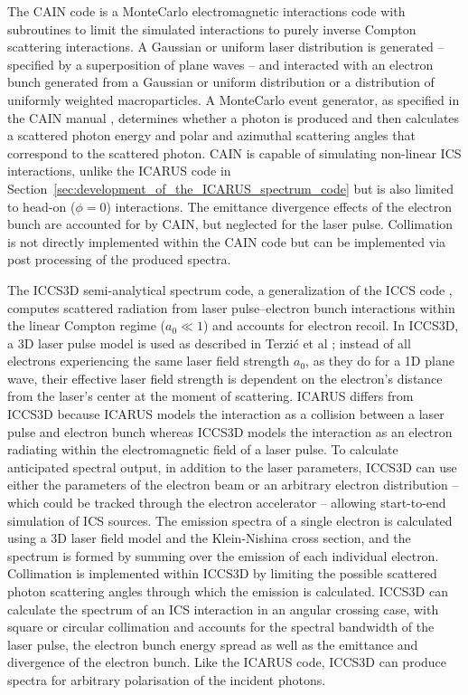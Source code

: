 \documentclass[../main.tex]{subfiles}
\begin{document}
The \textsc{CAIN} code is a MonteCarlo electromagnetic interactions code with subroutines to limit the simulated interactions to purely inverse Compton scattering interactions. A Gaussian or uniform laser distribution is generated -- specified by a superposition of plane waves -- and interacted with an electron bunch generated from a Gaussian or uniform distribution or a distribution of uniformly weighted macroparticles. A MonteCarlo event generator, as specified in the \textsc{CAIN} manual \cite{yokoya2003users}, determines whether a photon is produced and then calculates a scattered photon energy and polar and azimuthal scattering angles that correspond to the scattered photon. \textsc{CAIN} is capable of simulating non-linear ICS interactions, unlike the \textsc{ICARUS} code in Section~\ref{sec:development_of_the_ICARUS_spectrum_code} but is also limited to head-on ($\phi=0$) interactions. The emittance divergence effects of the electron bunch are accounted for by \textsc{CAIN}, but neglected for the laser pulse. Collimation is not directly implemented within the \textsc{CAIN} code but can be implemented via post processing of the produced spectra. 

The \textsc{ICCS3D} semi-analytical spectrum code, a generalization of the \textsc{ICCS} code \cite{krafft2016laser,ranjan2018simulation}, computes scattered radiation from laser pulse--electron bunch interactions within the linear Compton regime ($a_{0}\ll 1$) and accounts for electron recoil. In \textsc{ICCS3D}, a 3D laser pulse model is used as described in Terzi\'c et al \cite{terzic2019improving}; instead of all electrons experiencing the same laser field strength $a_{0}$, as they do for a 1D plane wave, their effective laser field strength is dependent on the electron's distance from the laser's center at the moment of scattering. \textsc{ICARUS} differs from \textsc{ICCS3D} because \textsc{ICARUS} models the interaction as a collision between a laser pulse and electron bunch whereas \textsc{ICCS3D} models the interaction as an electron radiating within the electromagnetic field of a laser pulse. To calculate anticipated spectral output, in addition to the laser parameters, \textsc{ICCS3D} can use either the parameters of the electron beam or an arbitrary electron distribution -- which could be tracked through the electron accelerator -- allowing start-to-end simulation of ICS sources. The emission spectra of a single electron is calculated using a 3D laser field model and the Klein-Nishina cross section, and the spectrum is formed by summing over the emission of each individual electron. Collimation is implemented within \textsc{ICCS3D} by limiting the possible scattered photon scattering angles through which the emission is calculated. \textsc{ICCS3D} can calculate the spectrum of an ICS interaction in an angular crossing case, with square or circular collimation and accounts for the spectral bandwidth of the laser pulse, the electron bunch energy spread as well as the emittance and divergence of the electron bunch. Like the \textsc{ICARUS} code, \textsc{ICCS3D} can produce spectra for arbitrary polarisation of the incident photons.   
\end{document}
